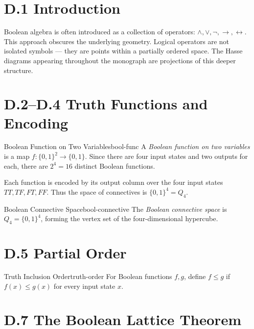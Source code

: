 
\section*{D.1 Introduction}

Boolean algebra is often introduced as a collection of operators:
$\land, \lor, \neg, \to, \leftrightarrow$.
This approach obscures the underlying geometry.
Logical operators are not isolated symbols — they are points within a
partially ordered space. The Hasse diagrams appearing throughout the monograph
are projections of this deeper structure.

\section*{D.2–D.4 Truth Functions and Encoding}

\begin{definition}{Boolean Function on Two Variables}{bool-func}
  A \emph{Boolean function on two variables} is a map
  $f : \{0,1\}^2 \to \{0,1\}$.
  Since there are four input states and two outputs for each,
  there are $2^4 = 16$ distinct Boolean functions.
\end{definition}

Each function is encoded by its output column over the four input states
$TT, TF, FT, FF$. Thus the space of connectives is $\{0,1\}^4 = Q_4$.

\begin{definition}{Boolean Connective Space}{bool-connective}
  The \emph{Boolean connective space} is $Q_4 = \{0,1\}^4$,
  forming the vertex set of the four-dimensional hypercube.
\end{definition}

\section*{D.5 Partial Order}

\begin{definition}{Truth Inclusion Order}{truth-order}
  For Boolean functions $f, g$, define $f \leq g$ if $f(x) \leq g(x)$
  for every input state $x$.
\end{definition}

\section*{D.7 The Boolean Lattice Theorem}

